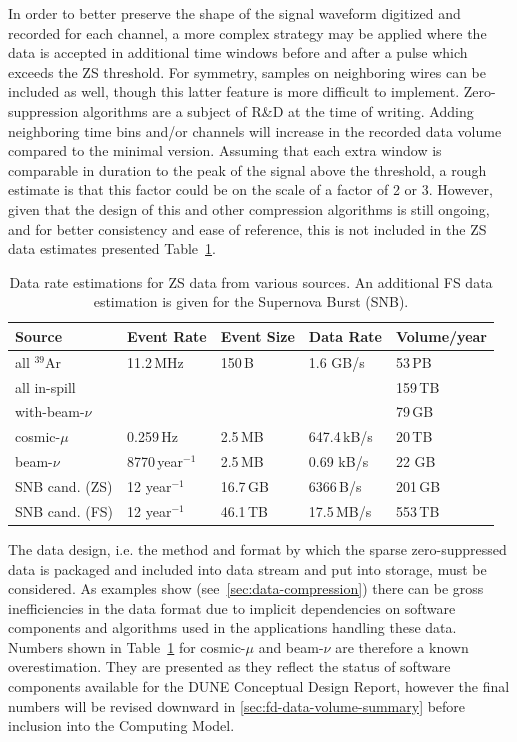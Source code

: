 In order to better preserve the shape of the signal waveform digitized and recorded for
each channel, a more complex strategy may be applied where the data is accepted in additional
time windows before and after a pulse which exceeds the ZS threshold.  For symmetry, samples on neighboring
wires can be included as well, though this latter feature is more difficult to implement.
Zero-suppression algorithms are a subject of R\&D at the time of writing.   Adding neighboring time bins
and/or channels will increase in the recorded data volume compared to the minimal version. Assuming that
each extra window is comparable in duration to the peak of the signal above the threshold,
a rough estimate is that this factor could be on the scale of a factor of 2 or 3. However, given
that the design of this and other compression algorithms is still ongoing, and for better consistency
and ease of reference, this is not included in the ZS data estimates presented Table~\ref{tab:zs-volume}.
	
\begin{table}[ht!]
\centering
\begin{tabular}{| p{1.2in} | p{0.9in} | p{0.75in} | p{0.8in} | p{0.9in} |}		\hline		
Source & Event Rate & Event Size & Data Rate & Volume/year \\ \hline
all $^{39}$Ar & 11.2\,MHz & 150\,B & 1.6 GB/s &  53\,PB \\ \hline
all in-spill & & & & 159\,TB \\ \hline
with-beam-$\nu$ & & & & 79\,GB \\ \hline \hline
cosmic-$\mu$ & 0.259\,Hz &2.5\,MB & 647.4\,kB/s & 20\,TB \\	\hline
beam-$\nu$ & 8770\,year$^{-1}$ & 2.5\,MB & 0.69 kB/s & 22 GB \\ \hline \hline
SNB cand. (ZS) & 12 year$^{-1}$ & 16.7\,GB & 6366\,B/s & 201\,GB \\ \hline
SNB cand. (FS) & 12 year$^{-1}$ & 46.1\,TB & 17.5\,MB/s & 553\,TB \\ \hline
\end{tabular}
\caption{Data rate estimations for ZS data from various sources.
An additional FS data estimation is given for the Supernova Burst (SNB).}
\label{tab:zs-volume}
\end{table}

The data design, i.e. the method and format by which the sparse zero-suppressed data is packaged and included into
data stream and put into storage, must be considered.
As examples show (see~\ref{sec:data-compression})
there can be gross inefficiencies in the data format due to implicit dependencies
on software components and algorithms used in the applications handling these data.
Numbers shown in Table~\ref{tab:zs-volume} for cosmic-$\mu$ and beam-$\nu$
are therefore a known overestimation. They are presented as they reflect the status
of software components available for the DUNE Conceptual Design Report,
however the final numbers will be revised downward in \ref{sec:fd-data-volume-summary}
before inclusion into the Computing Model.

